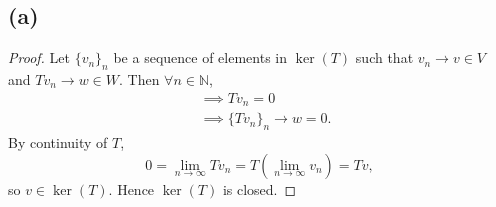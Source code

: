 \documentclass{article}
\begin{document}
\subsection*{(a)}
\begin{proof}
	Let $\{v_n\}_n$ be a sequence of elements in $\ker{(T)}$ such that $v_n \rightarrow v \in V$ and $Tv_n \rightarrow w \in W$. Then $\forall n \in \mathbb{N}$,
	\begin{align}
		&\implies Tv_n = 0 \\
		&\implies \{Tv_n\}_n \rightarrow w = 0.
	\end{align}
	By continuity of $T$, 
	\begin{equation}
		0 = \lim_{n\to\infty} Tv_n = T\left(\lim_{n\to\infty}v_n\right) = Tv,
	\end{equation}
	so $v \in \ker{(T)}$. Hence $\ker{(T)}$ is closed.
\end{proof}
\end{document}
